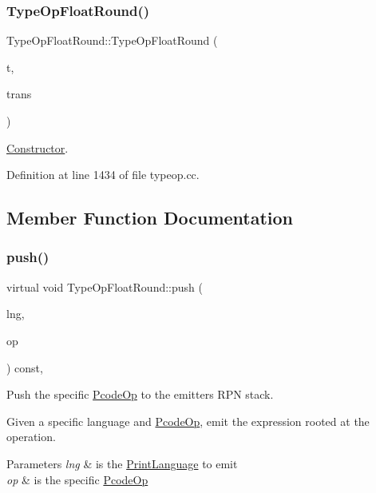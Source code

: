 \subsubsection{\texorpdfstring{TypeOpFloatRound()}{TypeOpFloatRound()}}
{\footnotesize\ttfamily Type\+Op\+Float\+Round\+::\+Type\+Op\+Float\+Round (\begin{DoxyParamCaption}\item[{\mbox{\hyperlink{class_type_factory}{Type\+Factory}} $\ast$}]{t,  }\item[{const \mbox{\hyperlink{class_translate}{Translate}} $\ast$}]{trans }\end{DoxyParamCaption})}



\mbox{\hyperlink{class_constructor}{Constructor}}. 



Definition at line 1434 of file typeop.\+cc.



\subsection{Member Function Documentation}
\mbox{\label{class_type_op_float_round_ae0b3d766f791e867f8e9f037b9c94d4f}} 
\subsubsection{\texorpdfstring{push()}{push()}}
{\footnotesize\ttfamily virtual void Type\+Op\+Float\+Round\+::push (\begin{DoxyParamCaption}\item[{\mbox{\hyperlink{class_print_language}{Print\+Language}} $\ast$}]{lng,  }\item[{const \mbox{\hyperlink{class_pcode_op}{Pcode\+Op}} $\ast$}]{op }\end{DoxyParamCaption}) const\hspace{0.3cm}{\ttfamily [inline]}, {\ttfamily [virtual]}}



Push the specific \mbox{\hyperlink{class_pcode_op}{Pcode\+Op}} to the emitter\textquotesingle{}s R\+PN stack. 

Given a specific language and \mbox{\hyperlink{class_pcode_op}{Pcode\+Op}}, emit the expression rooted at the operation. 
\begin{DoxyParams}{Parameters}
{\em lng} & is the \mbox{\hyperlink{class_print_language}{Print\+Language}} to emit \\
\hline
{\em op} & is the specific \mbox{\hyperlink{class_pcode_op}{Pcode\+Op}} \\
\hline
\end{DoxyParams}


